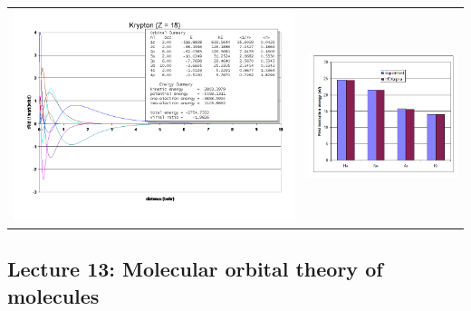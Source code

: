 \documentclass[11pt]{article}
\begin{document}
\begin{table}[]
\begin{tabular}{cc}
\includegraphics[scale=0.33]{Images/Slide5.png} & \includegraphics[scale=0.5]{Images/Slide6.png} 
\end{tabular}
\end{table}

\subsection{Lecture 13: Molecular orbital theory of molecules}
\label{sec:org74cef81}
\end{document}
